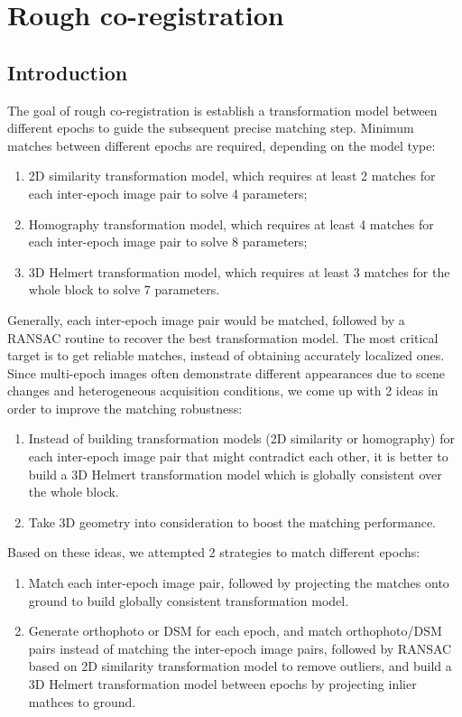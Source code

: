 
\chapter{Rough co-registration}
\label{chap:intro}
\minitoc

\section{Introduction}
The goal of rough co-registration is establish a transformation model between different epochs to guide the subsequent precise matching step. Minimum matches between different epochs are required, depending on the model type:\\
\begin{enumerate}
    \item 2D similarity transformation model, which requires at least 2 matches for each inter-epoch image pair to solve 4 parameters;
    \item Homography transformation model, which requires at least 4 matches for each inter-epoch image pair to solve 8 parameters;
    \item 3D Helmert transformation model, which requires at least 3 matches for the whole block to solve 7 parameters.
\end{enumerate}
Generally, each inter-epoch image pair would be matched, followed by a RANSAC routine to recover the best transformation model.
The most critical target is to get reliable matches, instead of obtaining accurately localized ones.
Since multi-epoch images often demonstrate different appearances due to scene changes and heterogeneous acquisition conditions, we come up with 2 ideas in order to improve the matching robustness:\\
\begin{enumerate}
    \item Instead of building transformation models (2D similarity or homography) for each inter-epoch image pair that might contradict each other, it is better to build a 3D Helmert transformation model which is globally consistent over the whole block.
    \item Take 3D geometry into consideration to boost the matching performance.
\end{enumerate}
Based on these ideas, we attempted 2 strategies to match different epochs:\\
\begin{enumerate}
    \item Match each inter-epoch image pair, followed by projecting the matches onto ground to build globally consistent transformation model.
    \item Generate orthophoto or DSM for each epoch, and match orthophoto/DSM pairs instead of matching the inter-epoch image pairs, followed by RANSAC based on 2D similarity transformation model to remove outliers, and build a 3D Helmert transformation model between epochs by projecting inlier mathces to ground.
\end{enumerate}

